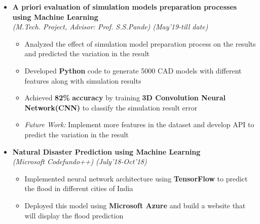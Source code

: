 \documentclass[a4paper,10pt]{article}
\begin{document}
\begin{itemize}%
\item \textbf{A priori evaluation of simulation models preparation processes using Machine Learning}\\
\emph{(M.Tech. Project, Advisor: Prof. S.S.Pande)} \hfill \emph{(May'19-till date)}
	\begin{itemize}[noitemsep,nolistsep]
	\item Analyzed the effect of simulation model preparation process on the results and predicted the variation in the result
	\item Developed \textbf{Python} code to generate 5000 CAD models with different features along with simulation results
	\item Achieved \textbf{82\%} \textbf{accuracy} by training \textbf{3D Convolution Neural Network(CNN)} to classify the simulation result error
	\item \textit{Future Work:} Implement more features in the dataset and develop API to predict the variation in the result
    \end{itemize}
    
\item \textbf{Natural Disaster Prediction using Machine Learning} \\
\emph{(Microsoft Codefundo++)} \hfill \emph{(July'18-Oct'18)}
	\begin{itemize}[noitemsep,nolistsep]
    \item Implemented neural network architecture using \textbf{TensorFlow} to predict the flood in different cities of India
    \item Deployed this model using \textbf{Microsoft Azure} and build a website that will display the flood prediction
	\end{itemize}
\end{itemize}
\end{document}
